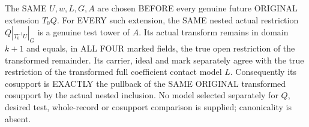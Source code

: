 \begin{theorem}
\label{hir:original-noncanonical-uniform-nonzero-contact-presentation}
\leanok
The SAME $U,w,L,G,A$ are chosen BEFORE every genuine future ORIGINAL
extension $T_0Q$. For EVERY such extension, the SAME nested actual
restriction $Q|_{T_0^{-1}U}|_G$ is a genuine test tower of $A$. Its actual
transform remains in domain $k+1$ and equals, in ALL FOUR marked fields,
the true open restriction of the transformed remainder. Its carrier,
ideal and mark separately agree with the true restriction of the transformed
full coefficient contact model $L$. Consequently its cosupport is EXACTLY
the pullback of the SAME ORIGINAL transformed cosupport by the actual
nested inclusion. No model selected separately for $Q$, desired test,
whole-record or cosupport comparison is supplied; canonicality is absent.
\end{theorem}
